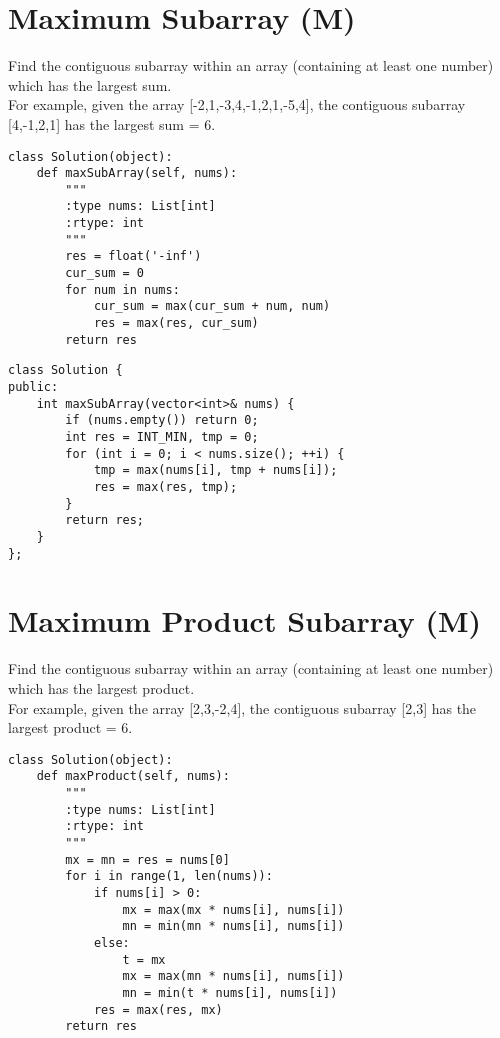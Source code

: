 \section{Maximum Subarray (M)}
Find the contiguous subarray within an array (containing at least one number) which has the largest sum.\\

For example, given the array [-2,1,-3,4,-1,2,1,-5,4], the contiguous subarray [4,-1,2,1] has the largest sum = 6. \\

\begin{lstlisting}
class Solution(object):
    def maxSubArray(self, nums):
        """
        :type nums: List[int]
        :rtype: int
        """
        res = float('-inf')
        cur_sum = 0
        for num in nums:
            cur_sum = max(cur_sum + num, num)
            res = max(res, cur_sum)
        return res
\end{lstlisting}

\begin{lstlisting}
class Solution {
public:
    int maxSubArray(vector<int>& nums) {
        if (nums.empty()) return 0;
        int res = INT_MIN, tmp = 0;
        for (int i = 0; i < nums.size(); ++i) {
            tmp = max(nums[i], tmp + nums[i]);
            res = max(res, tmp);
        }
        return res;
    }
};
\end{lstlisting}


\section{Maximum Product Subarray (M)}
Find the contiguous subarray within an array (containing at least one number) which has the largest product.\\

For example, given the array [2,3,-2,4], the contiguous subarray [2,3] has the largest product = 6. \\

\begin{lstlisting}
class Solution(object):
    def maxProduct(self, nums):
        """
        :type nums: List[int]
        :rtype: int
        """
        mx = mn = res = nums[0]
        for i in range(1, len(nums)):
            if nums[i] > 0:
                mx = max(mx * nums[i], nums[i])
                mn = min(mn * nums[i], nums[i])
            else:
                t = mx
                mx = max(mn * nums[i], nums[i])
                mn = min(t * nums[i], nums[i])
            res = max(res, mx)
        return res
\end{lstlisting}

